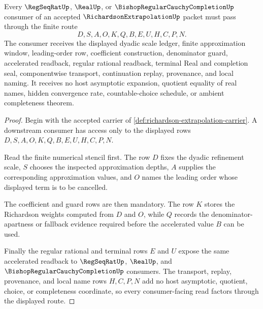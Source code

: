\begin{theorem}
\label{thm:richardson-extrapolation-regseqrat-real-seal-handoff}
Every $\RegSeqRatUp$, $\RealUp$, or $\BishopRegularCauchyCompletionUp$ consumer of an accepted $\RichardsonExtrapolationUp$ packet must pass through the finite route
$$
D,S,A,O,K,Q,B,E,U,H,C,P,N .
$$
The consumer receives the displayed dyadic scale ledger, finite approximation window, leading-order row, coefficient construction, denominator guard, accelerated readback, regular rational readback, terminal Real and completion seal, componentwise transport, continuation replay, provenance, and local naming. It receives no host asymptotic expansion, quotient equality of real names, hidden convergence rate, countable-choice schedule, or ambient completeness theorem.
\end{theorem}
\begin{proof}
Begin with the accepted carrier of \autoref{def:richardson-extrapolation-carrier}. A downstream consumer has access only to the displayed rows $D,S,A,O,K,Q,B,E,U,H,C,P,N$.

Read the finite numerical stencil first. The row $D$ fixes the dyadic refinement scale, $S$ chooses the inspected approximation depths, $A$ supplies the corresponding approximation values, and $O$ names the leading order whose displayed term is to be cancelled.

The coefficient and guard rows are then mandatory. The row $K$ stores the Richardson weights computed from $D$ and $O$, while $Q$ records the denominator-apartness or fallback evidence required before the accelerated value $B$ can be used.

Finally the regular rational and terminal rows $E$ and $U$ expose the same accelerated readback to $\RegSeqRatUp$, $\RealUp$, and $\BishopRegularCauchyCompletionUp$ consumers. The transport, replay, provenance, and local name rows $H,C,P,N$ add no host asymptotic, quotient, choice, or completeness coordinate, so every consumer-facing read factors through the displayed route.
\end{proof}


